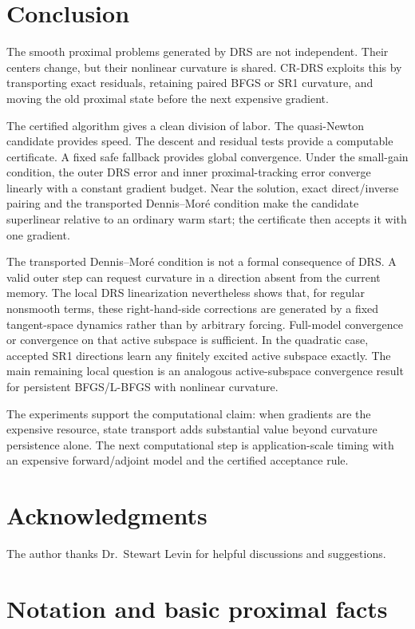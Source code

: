 \documentclass[10pt,leqno]{amsart}
\numberwithin{equation}{section}
\numberwithin{algorithm}{section}
\theoremstyle{remark}
\begin{document}
\section{Conclusion}
\label{sec:conclusion-focused}

The smooth proximal problems generated by DRS are not independent.  Their centers change, but their nonlinear curvature is shared.  CR-DRS exploits this by transporting exact residuals, retaining paired BFGS or SR1 curvature, and moving the old proximal state before the next expensive gradient.

The certified algorithm gives a clean division of labor.  The quasi-Newton candidate provides speed.  The descent and residual tests provide a computable certificate.  A fixed safe fallback provides global convergence.  Under the small-gain condition, the outer DRS error and inner proximal-tracking error converge linearly with a constant gradient budget.  Near the solution, exact direct/inverse pairing and the transported Dennis--Mor\'e condition make the candidate superlinear relative to an ordinary warm start; the certificate then accepts it with one gradient.

The transported Dennis--Mor\'e condition is not a formal consequence of DRS.  A valid outer step can request curvature in a direction absent from the current memory.  The local DRS linearization nevertheless shows that, for regular nonsmooth terms, these right-hand-side corrections are generated by a fixed tangent-space dynamics rather than by arbitrary forcing.  Full-model convergence or convergence on that active subspace is sufficient.  In the quadratic case, accepted SR1 directions learn any finitely excited active subspace exactly.  The main remaining local question is an analogous active-subspace convergence result for persistent BFGS/L-BFGS with nonlinear curvature.

The experiments support the computational claim: when gradients are the expensive resource, state transport adds substantial value beyond curvature persistence alone.  The next computational step is application-scale timing with an expensive forward/adjoint model and the certified acceptance rule.

\section*{Acknowledgments}
The author thanks Dr.~Stewart Levin for helpful discussions and suggestions.


\appendix
\section{Notation and basic proximal facts}
\label{app:proximal-facts}
\end{document}
